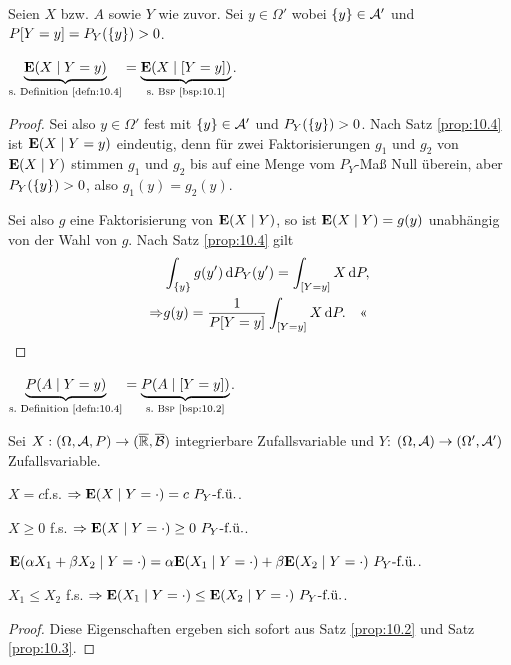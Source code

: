 \begin{bsp}
Seien $X$ bzw. $A$ sowie $Y$ wie zuvor. Sei $y \in \Omega '$ wobei
$\setd{y} \in {\AA}'$ und $P[Y=y]=P_{Y}(\setd{y})>0$.
\begin{bspenum}
\item
$\underbrace{\E(X\mid Y=y)}_{\text{s.\ Definition \ref{defn:10.4}}}
=
\underbrace{ \E(X\mid [Y=y])}_{\text{s.\ \textsc{Bsp} \ref{bsp:10.1}}}$.
\begin{proof}
Sei also $y\in\Omega'$ fest mit $\setd{y}\in\AA'$ und $P_Y(\setd{y})>0$. Nach
Satz \ref{prop:10.4} ist $\E(X\mid Y=y)$ eindeutig, denn für zwei
Faktorisierungen $g_1$ und $g_2$ von $\E(X\mid Y)$ stimmen $g_1$ und $g_2$ bis
auf eine Menge vom $P_Y$-Maß Null überein, aber $P_Y(\setd{y})>0$, also
$g_1(y)=g_2(y)$.

Sei also $g$ eine Faktorisierung von $\E(X\mid Y)$, so ist $\E(X\mid Y)=g(y)$
unabhängig von der Wahl von $g$. Nach Satz \ref{prop:10.4}  gilt
\begin{align*}
&\int_{\setd{y}} g(y')\dP_Y(y') = \int_{[Y=y]} X\dP,\\
\Rightarrow &
g(y) = \frac{1}{P[Y=y]} \int_{[Y=y]} X\dP.\qedhere
\end{align*}
\end{proof}
\item $\underbrace{P(A\mid Y=y)}_{\text{s.\ Definition \ref{defn:10.4}}}
=
\underbrace{P(A\mid [Y=y])}_{\text{s.\ \textsc{Bsp} \ref{bsp:10.2}}}$.\bsphere
\end{bspenum}
\end{bsp}

\begin{prop}
\label{prop:10.5}
Sei $X: (\Omega, {\AA}, P) \to (\RA, \overline{\BB})$ integrierbare
Zufallsvariable und $Y$: $(\Omega, {\AA})\to (\Omega ', {\AA}')$
Zufallsvariable.
\begin{propenum}
\item
$X=c $f.s. $\Rightarrow \E(X\mid Y=\cdot ) = c \fu{P_{Y}}$.
\item
$X\geq 0 $ f.s. $\Rightarrow \E(X\mid Y= \cdot) \geq 0 \fu{P_{Y}}$.
\item
$\E(\alpha X_{1} +\beta X_{2} \mid Y=\cdot ) = \alpha \E(X_{1}\mid Y=\cdot)
+ \beta \E(X_{2} \mid Y=\cdot ) \fu{P_{Y}}$.
\item $X_{1} \leq X_{2}$ f.s. $\Rightarrow \E(X_{1}\mid Y=\cdot )\leq
  \E(X_{2} \mid Y=\cdot ) \fu{P_{Y}}$.\fishhere
\end{propenum}
\end{prop}
\begin{proof}
Diese Eigenschaften ergeben sich sofort aus Satz \ref{prop:10.2} und
Satz \ref{prop:10.3}.\qedhere
\end{proof}


